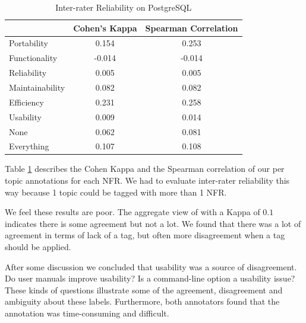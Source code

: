 \documentclass[smallextended]{svjour3}       %
\begin{document}

\begin{table}
\centering
\begin{tabular}{l|c|c}
\hline
            & Cohen's Kappa & Spearman Correlation \\ \hline
Portability & 0.154 & 0.253  \\
Functionality & -0.014 & -0.014 \\
Reliability & 0.005 & 0.005 \\
Maintainability & 0.082 & 0.082 \\
Efficiency & 0.231 & 0.258 \\
Usability & 0.009 & 0.014 \\
None &      0.062 & 0.081 \\ \hline 
Everything & 0.107 & 0.108 \\ \hline
\end{tabular}
\caption{Inter-rater Reliability on PostgreSQL}
\label{tab:interr}
\end{table}

Table \ref{tab:interr} describes the Cohen Kappa and the Spearman
correlation of our per topic annotations for each NFR. We had to
evaluate inter-rater reliability this way because 1 topic could be
tagged with more than 1 NFR.

We feel these results are poor. The aggregate view of with a Kappa of
$0.1$ indicates there is some agreement but not a lot. We found that
there was a lot of agreement in terms of lack of a tag, but often more
disagreement when a tag should be applied.

After some discussion we concluded that usability was a source of
disagreement. Do user manuals improve usability? Is a command-line
option a usability issue? These kinds of questions illustrate some of
the agreement, disagreement and ambiguity about these labels. Furthermore, 
both annotators found that the annotation was time-consuming and
difficult.

\end{document}
